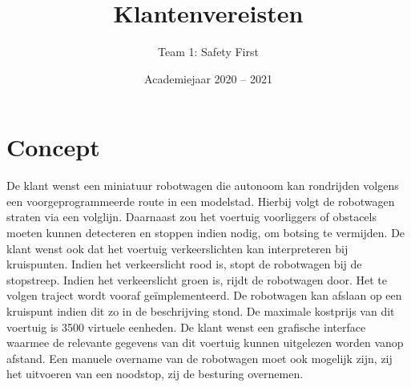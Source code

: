 \documentclass[a4paper,kulak]{kulakarticle} %
\date{Academiejaar 2020 -- 2021}
\title{Klantenvereisten}
\author{Team 1: Safety First}
\begin{document}
\maketitle

\section{Concept}

De klant wenst een miniatuur robotwagen die autonoom kan rondrijden volgens een voorgeprogrammeerde route in een modelstad. Hierbij volgt de robotwagen straten via een volglijn. Daarnaast zou het voertuig voorliggers of obstacels moeten kunnen detecteren en stoppen indien nodig, om botsing te vermijden. De klant wenst ook dat het voertuig verkeerslichten kan interpreteren bij kruispunten. Indien het verkeerslicht rood is, stopt de robotwagen bij de stopstreep. Indien het verkeerslicht groen is, rijdt de robotwagen door.  Het te volgen traject wordt vooraf geïmplementeerd. De robotwagen kan afslaan op een kruispunt indien dit zo in de beschrijving stond. De maximale kostprijs van dit voertuig is 3500 virtuele eenheden. De klant wenst een grafische interface waarmee de relevante gegevens van dit voertuig kunnen uitgelezen worden vanop afstand. Een manuele overname van de robotwagen moet ook mogelijk zijn, zij het uitvoeren van een noodstop, zij de besturing overnemen.
\end{document}
